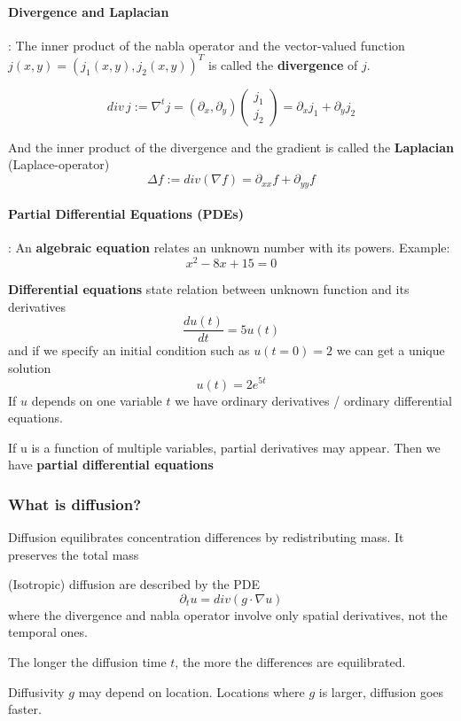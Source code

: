 \documentclass{article}
\begin{document}
\paragraph{Divergence and Laplacian}: The inner product of the nabla operator and the vector-valued function $j(x,y) = (j_1(x,y),j_2(x,y))^T$ is called the \textbf{divergence} of $j$.

\[div\, j := \nabla^t j = (\partial_x, \partial_y)\begin{pmatrix}
  j_1 \\
  j_2
\end{pmatrix} = \partial_x j_1 + \partial_y j_2\]

And the inner product of the divergence and the gradient is called the \textbf{Laplacian} (Laplace-operator)
\[\Delta f := div (\nabla f) = \partial_{xx}f + \partial_{yy}f\]

\paragraph{Partial Differential Equations (PDEs)}: An \textbf{algebraic equation} relates an unknown number with its powers. Example:
\[x^2 - 8x + 15 = 0\]

\textbf{Differential equations} state relation between unknown function and its derivatives
\[\frac{du(t)}{dt} = 5u(t)\]
and if we specify an initial condition such as $u(t=0) = 2$ we can get a unique solution
\[u(t) = 2e^{5t}\]
If $u$ depends on one variable $t$ we have ordinary derivatives / ordinary differential equations.

If u is a function of multiple variables, partial derivatives may appear. Then we have \textbf{partial differential equations}

\subsubsection{What is diffusion?}
Diffusion equilibrates concentration differences by redistributing mass. It preserves the total mass

(Isotropic) diffusion are described by the PDE
\[\partial_t u = div(g\cdot \nabla u)\]
where the divergence and nabla operator involve only spatial derivatives, not the temporal ones.

The longer the diffusion time $t$, the more the differences are equilibrated.

Diffusivity $g$ may depend on location. Locations where $g$ is larger, diffusion goes faster.
\end{document}
